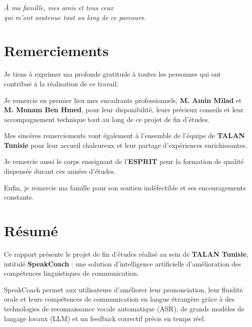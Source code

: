 \documentclass[12pt,a4paper]{report}
\begin{document}
\newpage
\thispagestyle{empty}
\vspace*{\fill}
\begin{center}
\textit{\Large À ma famille, mes amis et tous ceux\\[0.5cm]
qui m'ont soutenue tout au long de ce parcours.}
\end{center}
\vspace*{\fill}

\newpage
\chapter*{Remerciements}

Je tiens à exprimer ma profonde gratitude à toutes les personnes qui ont contribué à la réalisation de ce travail.

Je remercie en premier lieu mes encadrants professionnels, \textbf{M. Amin Milad} et \textbf{M. Monam Ben Hmed}, pour leur disponibilité, leurs précieux conseils et leur accompagnement technique tout au long de ce projet de fin d'études.

Mes sincères remerciements vont également à l'ensemble de l'équipe de \textbf{TALAN Tunisie} pour leur accueil chaleureux et leur partage d'expériences enrichissantes.

Je remercie aussi le corps enseignant de l'\textbf{ESPRIT} pour la formation de qualité dispensée durant ces années d'études.

Enfin, je remercie ma famille pour son soutien indéfectible et ses encouragements constants.

\chapter*{Résumé}

Ce rapport présente le projet de fin d'études réalisé au sein de \textbf{TALAN Tunisie}, intitulé \textbf{SpeakCoach} : une solution d'intelligence artificielle d'amélioration des compétences linguistiques de communication.

SpeakCoach permet aux utilisateurs d'améliorer leur prononciation, leur fluidité orale et leurs compétences de communication en langue étrangère grâce à des technologies de reconnaissance vocale automatique (ASR), de grands modèles de langage locaux (LLM) et un feedback correctif précis en temps réel.
\end{document}
